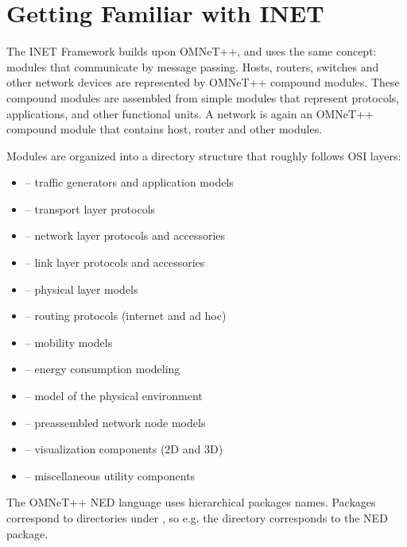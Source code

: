\section{Getting Familiar with INET}
\label{sec:usage:getting-familiar-with-inet}

The INET Framework builds upon OMNeT++, and uses the same concept: modules
that communicate by message passing. Hosts, routers, switches and other
network devices are represented by OMNeT++ compound modules. These compound
modules are assembled from simple modules that represent protocols,
applications, and other functional units. A network is again an OMNeT++
compound module that contains host, router and other modules.

Modules are organized into a directory structure that roughly follows
OSI layers:

\begin{itemize}
  \item {} -- traffic generators and application models
  \item {} -- transport layer protocols
  \item {} -- network layer protocols and accessories
  \item {} -- link layer protocols and accessories
  \item {} -- physical layer models
  \item {} -- routing protocols (internet and ad hoc)
  \item {} -- mobility models
  \item {} -- energy consumption modeling
  \item {} -- model of the physical environment
  \item {} -- preassembled network node models
  \item {} -- visualization components (2D and 3D)
  \item {} -- miscellaneous utility components
\end{itemize}

The OMNeT++ NED language uses hierarchical packages names. Packages correspond
to directories under , so e.g. the 
directory corresponds to the  NED package.

